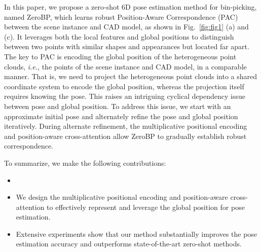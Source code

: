 %
In this paper, we propose a zero-shot 6D pose estimation method for bin-picking, named ZeroBP, which learns robust Position-Aware Correspondence (PAC) between the scene instance and CAD model, as shown in Fig.~\ref{fig:fig1} (a) and (c). It leverages both the local features and global positions to distinguish between two points with similar shapes and appearances but located far apart. The key to PAC is encoding the global position of the heterogeneous point clouds, \emph{i.e.}, the points of the scene instance and CAD model, in a comparable manner. That is, we need to project the heterogeneous point clouds into a shared coordinate system to encode the global position, whereas the projection itself requires knowing the pose. This raises an intriguing cyclical dependency issue between pose and global position. To address this issue, we start with an approximate initial pose and alternately refine the pose and global position iteratively.  During alternate refinement, the multiplicative positional encoding and position-aware cross-attention allow ZeroBP to gradually establish robust correspondence.

 To summarize, we make the following contributions:
\begin{itemize}
    \item {}
    \item We design the multiplicative positional encoding and position-aware cross-attention to effectively represent and leverage the global position for pose estimation.
    \item Extensive experiments show that our method substantially improves the pose estimation accuracy and outperforms state-of-the-art zero-shot methods.
\end{itemize}
